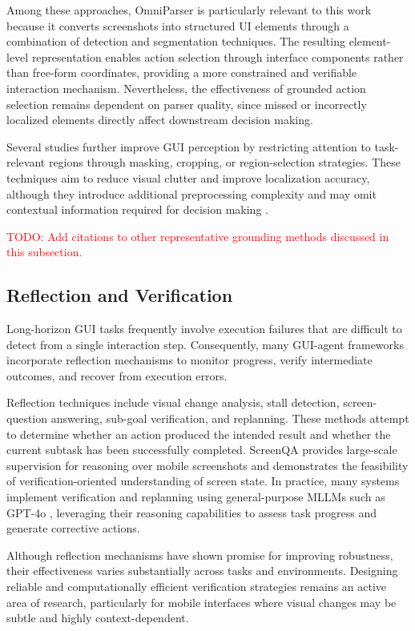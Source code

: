 Among these approaches, OmniParser \cite{lu2024omniparser} is particularly relevant to this work because it converts screenshots into structured UI elements through a combination of detection and segmentation techniques. The resulting element-level representation enables action selection through interface components rather than free-form coordinates, providing a more constrained and verifiable interaction mechanism. Nevertheless, the effectiveness of grounded action selection remains dependent on parser quality, since missed or incorrectly localized elements directly affect downstream decision making.

Several studies further improve GUI perception by restricting attention to task-relevant regions through masking, cropping, or region-selection strategies. These techniques aim to reduce visual clutter and improve localization accuracy, although they introduce additional preprocessing complexity and may omit contextual information required for decision making \cite{ge2025iris,chen2025less}.

\textcolor{red}{TODO: Add citations to other representative grounding methods discussed in this subsection.}

\subsection{Reflection and Verification}

Long-horizon GUI tasks frequently involve execution failures that are difficult to detect from a single interaction step. Consequently, many GUI-agent frameworks incorporate reflection mechanisms to monitor progress, verify intermediate outcomes, and recover from execution errors.

Reflection techniques include visual change analysis, stall detection, screen-question answering, sub-goal verification, and replanning. These methods attempt to determine whether an action produced the intended result and whether the current subtask has been successfully completed. ScreenQA \cite{hsiao2025screenqa} provides large-scale supervision for reasoning over mobile screenshots and demonstrates the feasibility of verification-oriented understanding of screen state. In practice, many systems implement verification and replanning using general-purpose MLLMs such as GPT-4o \cite{hurst2024gpt}, leveraging their reasoning capabilities to assess task progress and generate corrective actions.

Although reflection mechanisms have shown promise for improving robustness, their effectiveness varies substantially across tasks and environments. Designing reliable and computationally efficient verification strategies remains an active area of research, particularly for mobile interfaces where visual changes may be subtle and highly context-dependent.

